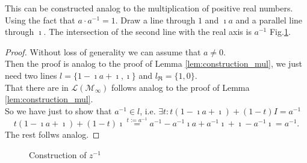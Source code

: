 This can be constructed analog to the multiplication of positive real numbers. Using the fact that $a\cdot a^{-1} = 1$. Draw a line through $1$ and $\imath a$ and a parallel line through $\imath$. The intersection of the second line with the real axis is $a^{-1}$ Fig.\ref{Fig.6}.
\begin{proof}
    Without loss of generality we can assume that $a \ne 0$.\\
    Then the proof is analog to the proof of Lemma \ref{lem:construction_mul}, we just need two lines $l = \{1-\imath a + \imath, \imath\}$ and $l_{\Re} = \{1,0\}$.\\
    That there are in $\mathcal{L(M_{\infty})}$ follows analog to the proof of Lemma \ref{lem:construction_mul}.\\ 
    So we have just to show that $a^{-1} \in l$, i.e. $\exists t: t  (1 - \imath a + \imath) + (1 - t)  I = a^{-1}$ $$t  (1 - \imath a + \imath) + (1 - t)  \imath \stackrel{t:=a^{-1}}{=}  a^{-1} - a^{-1} \imath a + a^{-1}\imath + \imath - a^{-1}\imath = a^{-1}.$$
    The rest follws analog.
\end{proof}
\begin{figure}[h!]
    \centering
    \caption{Construction of $z^{-1}$}
    \label{Fig.6}
\end{figure}


